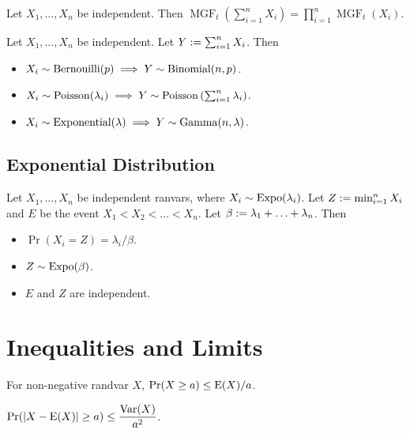 \documentclass[a4paper, 12pt, fleqn]{article}
\DeclareMathOperator{\MGF}{MGF}
\begin{document}
\begin{theorem}
Let $X_1, \ldots, X_n$ be independent. Then
$\MGF_t\left(\sum_{i=1}^n X_i\right) = \prod_{i=1}^n \MGF_t(X_i)$.
\end{theorem}

\begin{theorem}
Let $X_1, \ldots, X_n$ be independent. Let $Y := \sum_{i=1}^n X_i$. Then
\begin{itemize}
\item $X_i \sim \operatorname{Bernouilli}(p)
    \implies Y \sim \operatorname{Binomial}(n, p)$.
\item $X_i \sim \operatorname{Poisson}(\lambda_i) \implies
    Y \sim \operatorname{Poisson}\left(\sum_{i=1}^n \lambda_i\right)$.
\item $X_i \sim \operatorname{Exponential}(\lambda) \implies
    Y \sim \operatorname{Gamma}(n, \lambda)$.
\end{itemize}
\end{theorem}

\subsection{Exponential Distribution}

\begin{theorem}
Let $X_1, \ldots, X_n$ be independent ranvars, where $X_i \sim \operatorname{Expo}(\lambda_i)$.
Let $Z := \min_{i=1}^n X_i$ and $E$ be the event $X_1 < X_2 < \ldots < X_n$.
Let $\beta := \lambda_1 + \ldots + \lambda_n$. Then
\begin{itemize}
\item $\Pr(X_i = Z) = \lambda_i/\beta$.
\item $Z \sim \operatorname{Expo}(\beta)$.
\item $E$ and $Z$ are independent.
\end{itemize}
\end{theorem}

\section{Inequalities and Limits}

\begin{theorem}[Markov]
For non-negative randvar $X$, $\Pr(X \ge a) \le \operatorname*{E}(X)/a$.
\end{theorem}

\begin{theorem}[Chebyshev]
$\displaystyle \Pr(|X-\operatorname*{E}(X)| \ge a) \le \frac{\operatorname*{Var}(X)}{a^2}$.
\end{theorem}
\end{document}
